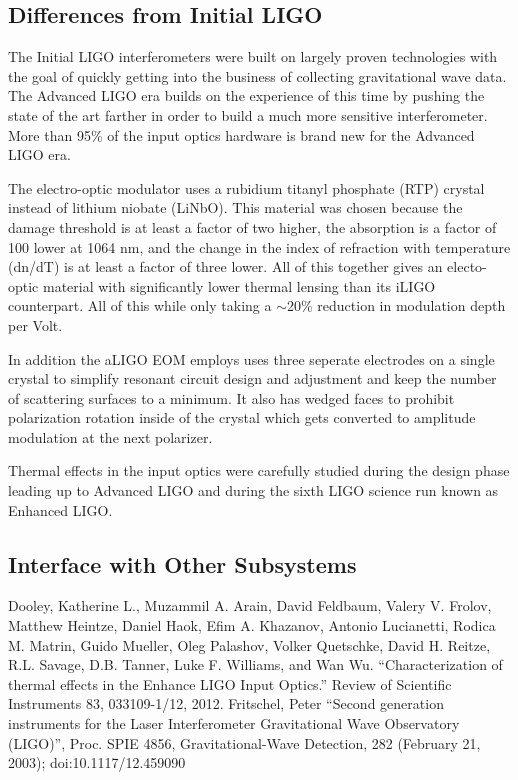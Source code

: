 \documentclass[10pt]{article}
\begin{document}
\subsection{Differences from Initial LIGO}

The Initial LIGO interferometers were built on largely proven technologies with the goal of 
quickly getting into the business of collecting gravitational wave data\cite{Fritschel2003}.  
The Advanced LIGO era builds on the experience of this time by pushing the state of the art 
farther in order to build a much more sensitive interferometer.  
More than 95\% of the input optics hardware is brand new for the Advanced LIGO era.  

The electro-optic modulator uses a rubidium titanyl phosphate (RTP) crystal instead 
of lithium niobate (LiNbO).  
This material was chosen because the damage threshold is at least a factor of two higher, 
the absorption is a factor of 100 lower at 1064 nm, and the change in the index of 
refraction with temperature (dn/dT) is at least a factor of three lower.  
All of this together gives an electo-optic material with significantly lower thermal 
lensing than its iLIGO counterpart.  
All of this while only taking a $\sim20\%$ reduction in modulation depth per Volt.

In addition the aLIGO EOM employs uses three seperate electrodes on a single crystal 
to simplify resonant circuit design and adjustment and keep the number of scattering 
surfaces to a minimum.
It also has wedged faces to prohibit polarization rotation inside of the crystal which 
gets converted to amplitude modulation at the next polarizer.  





Thermal effects in the input optics were carefully studied during the design phase leading up 
to Advanced LIGO and during the sixth LIGO science run known as Enhanced LIGO\cite{Dooley2012}.  



\subsection{Interface with Other Subsystems}



\begin{thebibliography}{9}
	 Dooley, Katherine L., Muzammil A. Arain, David Feldbaum, Valery V. Frolov, 
		Matthew Heintze, Daniel Haok, Efim A. Khazanov, Antonio Lucianetti, Rodica M. Matrin, Guido Mueller, 
		Oleg Palashov, Volker Quetschke, David H. Reitze, R.L. Savage, D.B. Tanner, Luke F. Williams, 
		and Wan Wu.  ``Characterization of thermal effects in the Enhance LIGO Input Optics.'' 
		Review of Scientific Instruments 83, 033109-1/12, 2012.
		Fritschel, Peter ``Second generation instruments for the Laser Interferometer 
		Gravitational Wave Observatory (LIGO)'', Proc. SPIE 4856, Gravitational-Wave Detection, 
		282 (February 21, 2003); doi:10.1117/12.459090
\end{thebibliography}	
\end{document}
